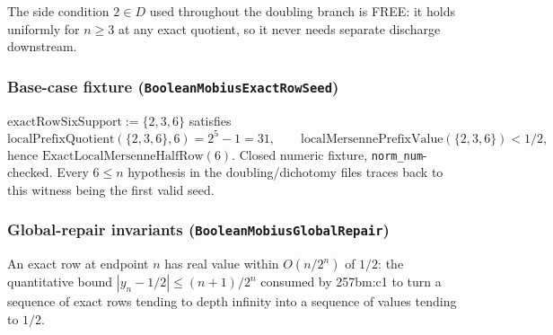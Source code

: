 \begin{prop}
The side condition $2\in D$ used throughout the doubling branch is FREE: it holds uniformly for
$n\ge3$ at any exact quotient, so it never needs separate discharge downstream.
\par\noindent{}   
\end{prop}

\subsubsection*{Base-case fixture (\texttt{BooleanMobiusExactRowSeed})}

\begin{defn}
$\mathrm{exactRowSixSupport} := \{2,3,6\}$ satisfies
\[
\mathrm{localPrefixQuotient}(\{2,3,6\},6) = 2^5-1 = 31,\qquad \mathrm{localMersennePrefixValue}(\{2,3,6\}) < 1/2,
\]
hence $\mathrm{ExactLocalMersenneHalfRow}(6)$. Closed numeric fixture, \texttt{norm\_num}-checked.
Every $6\le n$ hypothesis in the doubling/dichotomy files traces back to this witness being the
first valid seed.
\par\noindent{}    
\end{defn}

\subsubsection*{Global-repair invariants (\texttt{BooleanMobiusGlobalRepair})}

\begin{prop}
An exact row at endpoint $n$ has real value within $O(n/2^n)$ of $1/2$: the quantitative bound
$|y_n-1/2|\le(n+1)/2^n$ consumed by 257bm:c1 to turn a sequence of exact rows tending to depth
infinity into a sequence of values tending to $1/2$.
\par\noindent{}   
\end{prop}

